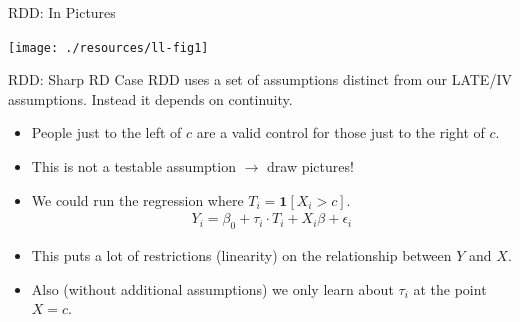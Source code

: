 \begin{frame}{RDD: In Pictures}
\begin{center}
\texttt{[image: ./resources/ll-fig1]}
\end{center}
\end{frame}


\begin{frame}{RDD: Sharp RD Case}
RDD uses a set of assumptions distinct from our LATE/IV assumptions. Instead it depends on \alert{continuity}.
\begin{itemize}
\item People just to the left of $c$ are a valid control for those just to the right of $c$.
\item \alert{This is not a testable assumption} $\rightarrow$ draw pictures!
\item We could run the regression where $T_i = \mathbf{1}[X_i > c]$.
\begin{eqnarray*}
Y_i = \beta_0 + \tau_i \cdot T_i + X_i \beta + \epsilon_i
\end{eqnarray*}
\item This puts a lot of restrictions (linearity) on the relationship between $Y$ and $X$.
\item Also (without additional assumptions) we only learn about $\tau_i$ at the point $X=c$.
\end{itemize}
\end{frame}




